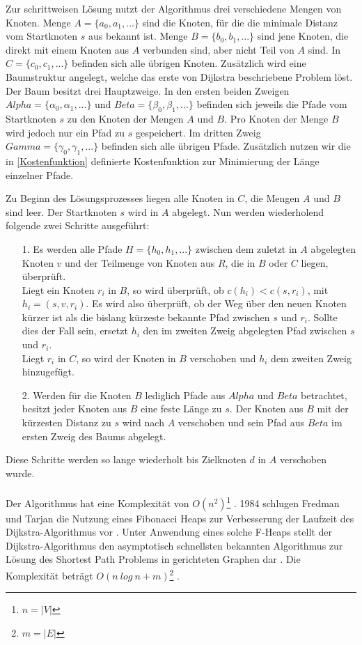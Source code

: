Zur schrittweisen Lösung nutzt der Algorithmus drei verschiedene Mengen von Knoten. Menge $A = \{a_0, a_1, ...\}$ sind die Knoten, für die die minimale Distanz vom Startknoten $s$ aus bekannt ist. Menge $B = \{b_0, b_1, ...\}$ sind jene Knoten, die direkt mit einem Knoten aus $A$ verbunden sind, aber nicht Teil von $A$ sind. In $C = \{c_0, c_1, ...\}$ befinden sich alle übrigen Knoten.
Zusätzlich wird eine Baumstruktur angelegt, welche das erste von Dijkstra beschriebene Problem löst. Der Baum besitzt drei Hauptzweige. In den ersten beiden Zweigen $Alpha = \{\alpha_0, \alpha_1, ...\}$ und $Beta = \{\beta_0, \beta_1, ...\}$ befinden sich jeweils die Pfade vom Startknoten $s$ zu den Knoten der Mengen $A$ und $B$. Pro Knoten der Menge $B$ wird jedoch nur ein Pfad zu $s$ gespeichert. Im dritten Zweig $Gamma = \{\gamma_0, \gamma_1, ...\}$ befinden sich alle übrigen Pfade. Zusätzlich nutzen wir die in \ref{Kostenfunktion} definierte Kostenfunktion zur Minimierung der Länge einzelner Pfade.

Zu Beginn des Lösungsprozesses liegen alle Knoten in $C$, die Mengen $A$ und $B$ sind leer. Der Startknoten $s$ wird in $A$ abgelegt. Nun werden wiederholend folgende zwei Schritte ausgeführt:
\begin{itemize}
	\item[1.] Es werden alle Pfade $H = \{h_0, h_1, ...\}$ zwischen dem zuletzt in $A$ abgelegten Knoten $v$ und der Teilmenge von Knoten aus $R$, die in $B$ oder $C$ liegen, überprüft.\\ Liegt ein Knoten $r_i$ in $B$, so wird überprüft, ob $c(h_i) < c(s,r_i)$, mit $h_i = \left(s, v, r_i\right)$. Es wird also überprüft, ob der Weg über den neuen Knoten kürzer ist als die bislang kürzeste bekannte Pfad zwischen $s$ und $r_i$. Sollte dies der Fall sein, ersetzt $h_i$ den im zweiten Zweig abgelegten Pfad zwischen $s$ und $r_i$. \\Liegt $r_i$ in $C$, so wird der Knoten in $B$ verschoben und $h_i$ dem zweiten Zweig hinzugefügt.
	\item[2.] Werden für die Knoten $B$ lediglich Pfade aus $Alpha$ und $Beta$ betrachtet, besitzt jeder Knoten aus $B$ eine feste Länge zu $s$. Der Knoten aus $B$ mit der kürzesten Distanz zu $s$ wird nach $A$ verschoben und sein Pfad aus $Beta$ im ersten Zweig des Baums abgelegt.
\end{itemize}
Diese Schritte werden so lange wiederholt bis Zielknoten $d$ in $A$ verschoben wurde. \\ \\	
Der Algorithmus hat eine Komplexität von $O(n^2)$\footnote{$n = |V|$} \cite[S.5]{Madkour.2017}. 1984 schlugen Fredman und Tarjan die Nutzung eines Fibonacci Heaps zur Verbesserung der Laufzeit des Dijkstra-Algorithmus vor \cite{Fredman.1987}. Unter Anwendung eines solche F-Heaps stellt der Dijkstra-Algorithmus den asymptotisch schnellsten bekannten Algorithmus zur Lösung des Shortest Path Problems in gerichteten Graphen dar \cite{Schmitz.2019}.  Die Komplexität beträgt $O(n\ log\ n + m)$\footnote{$m = |E|$} \cite[S.5]{Madkour.2017}.

